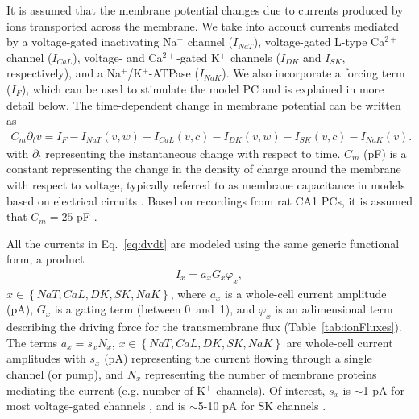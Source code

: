 \documentclass[10pt,letterpaper]{article}
\newcommand{\Ca}{Ca$^{2+}$}
\newcommand{\K}{K$^{+}$}
\newcommand{\Na}{Na$^{+}$}
\newcommand{\lrSet}[1]{\left\{#1\right\}}
\begin{document}
It is assumed that the membrane potential changes due to currents produced by ions transported across the membrane. We take into account currents mediated by a voltage-gated inactivating {\Na} channel ($I_{NaT}$), voltage-gated L-type {\Ca} channel ($I_{CaL}$), voltage- and {\Ca}-gated {\K} channels ($I_{DK}$ and $I_{SK}$, respectively), and a {\Na}/{\K}-ATPase ($I_{NaK}$). We also incorporate a forcing term ($I_F$), which can be used to stimulate the model PC and is explained in more detail below. The time-dependent change in membrane potential can be written as
\begin{eqnarray}
\label{eq:dvdt}
C_m \partial_t v= I_{F} - I_{NaT}(v,w) - I_{CaL}(v,c) - I_{DK}(v,w) - I_{SK}(v,c) - I_{NaK}(v). 
\end{eqnarray}
with $\partial_t$ representing the instantaneous change with respect to time. $C_m$ (pF) is a constant representing the change in the density of charge around the membrane with respect to voltage, typically referred to as membrane capacitance in models based on electrical circuits  \cite{herrera2020nonequivalent}. Based on recordings from rat CA1 PCs, it is  assumed that $C_m=25$  pF \cite{groc2002vivo}.

All the currents in Eq.~\eqref{eq:dvdt} are modeled using the same generic functional form, a product
\begin{eqnarray}
    I_x = a_x G_x    \varphi_x, 
\end{eqnarray}
 $x \in \lrSet{NaT,CaL,DK,SK,NaK}$, where $a_x$ is a whole-cell current amplitude (pA), $G_x$ is a gating term (between 0~and~1), and $\varphi_x$ is an adimensional term describing the driving force for the transmembrane flux (Table~\ref{tab:ionFluxes}). The terms $a_x= s_x N_x$, $x \in \lrSet{NaT,CaL,DK,SK,NaK}$ are whole-cell current amplitudes with
$s_x$ (pA) representing the current flowing through a single channel (or pump), and $N_x$ representing the number of membrane proteins mediating the current (e.g. {number of {\K} channels}). Of interest, $s_x$ is $\sim$1 pA for most voltage-gated channels \cite{hille2001ion}, and is $\sim$5-10 pA for SK channels \cite{stocker20042+}.
\end{document}
